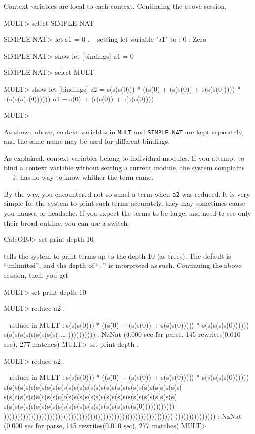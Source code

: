 \documentclass[a4paper]{memoir}
\begin{document}
Context variables are local to each context. Continuing the above session,
\begin{vvtm}
\begin{ccode}
  MULT> select SIMPLE-NAT

  SIMPLE-NAT> let a1 = 0 .
  -- setting let variable "a1" to :
      0 : Zero

  SIMPLE-NAT> show let
  [bindings] 
  a1 = 0

  SIMPLE-NAT> select MULT

  MULT> show let
  [bindings] 
  a2 = s(s(s(0))) * ((s(0) + (s(s(0)) + s(s(s(0))))) * s(s(s(s(s(0))))))
  a1 = s(0) + (s(s(0)) + s(s(s(0))))

  MULT> 
\end{ccode}
\end{vvtm}
As shown above, context variables in \verb|MULT| and \verb|SIMPLE-NAT|
are kept separately, and the same name may be used for different
bindings.

\begin{warning}
  As explained, context variables belong to individual modules. If you
  attempt to bind a context variable without setting a current module,
  the system complains ---  it has no way to know whither the term came.
\end{warning}

By the way, you encountered not so small a term when \verb|a2| was
reduced. It is very simple for the system to print such terms accurately,
they may sometimes cause you nausea or headache. If you expect
the terms to be large, and need to see only their broad outline,
you can use a switch.
\begin{vvtm}
\begin{ccode}
  CafeOBJ> set print depth 10
\end{ccode}
\end{vvtm}
tells the system to print terms up to the depth 10 (as trees).
The default is ``unlimited'', and the depth of ``\verb|.|'' is
interpreted as such. Continuing the above session, then, you get
\begin{vvtm}
\begin{ccode}
  MULT> set print depth 10

  MULT> reduce a2 .

  -- reduce in MULT : s(s(s(0))) * ((s(0) + (s(s(0)) + s(s(s(0)))))
       * s(s(s(s(s(0))))))
  s(s(s(s(s(s(s(s(s(s( ... )))))))))) : NzNat
  (0.000 sec for parse, 145 rewrites(0.010 sec), 277 matches)
  MULT> set print depth .

  MULT> reduce a2 .

  -- reduce in MULT : s(s(s(0))) * ((s(0) + (s(s(0)) + s(s(s(0)))))
       * s(s(s(s(s(0))))))
  s(s(s(s(s(s(s(s(s(s(s(s(s(s(s(s(s(s(s(s(s(s(s(s(s(s(s(s(s(s(s(s(s(
    s(s(s(s(s(s(s(s(s(s(s(s(s(s(s(s(s(s(s(s(s(s(s(s(s(s(s(s(s(s(s(s(
    s(s(s(s(s(s(s(s(s(s(s(s(s(s(s(s(s(s(s(s(s(s(s(s(s(0))))))))))))
    )))))))))))))))))))))))))))))))))))))))))))))))))))))))))))))))
    ))))))))))))))) : NzNat
  (0.000 sec for parse, 145 rewrites(0.010 sec), 277 matches)
  MULT> 
\end{ccode}
\end{vvtm}
\end{document}

